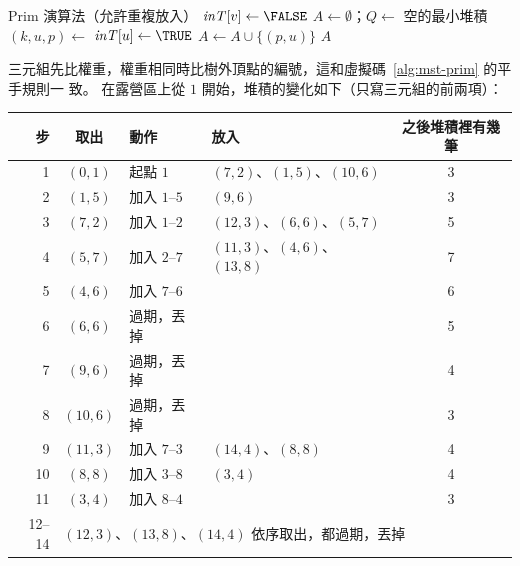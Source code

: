 \begin{pseudo}[label=alg:mst-prim-lazy]{Prim 演算法（允許重複放入）}
        \State $\mathit{inT}[v] \gets \FALSE$
    \EndFor
    \State $A \gets \emptyset$；$Q \gets$ 空的最小堆積
    \State {} 
        \State $(k, u, p) \gets$ 
         
            \State $\mathit{inT}[u] \gets \TRUE$
                \State $A \gets A \cup \{(p, u)\}$
            \EndIf
                    \State {}
                \EndIf
            \EndFor
        \EndIf
    \EndWhile
    \State \Return $A$
\EndProcedure
\end{pseudo}

三元組先比權重，權重相同時比樹外頂點的編號，這和虛擬碼~\ref{alg:mst-prim} 的平手規則一
致。 在露營區上從 $1$ 開始，堆積的變化如下（只寫三元組的前兩項）：

\begin{center}
\footnotesize
\setlength{\tabcolsep}{4pt}
\begin{tabular}{rcllc}
\toprule
步 & 取出 & 動作 & 放入 & 之後堆積裡有幾筆 \\
\midrule
1 & $(0, 1)$ & 起點 $1$ & $(7, 2)$、$(1, 5)$、$(10, 6)$ & 3 \\
2 & $(1, 5)$ & 加入 $1$--$5$ & $(9, 6)$ & 3 \\
3 & $(7, 2)$ & 加入 $1$--$2$ & $(12, 3)$、$(6, 6)$、$(5, 7)$ & 5 \\
4 & $(5, 7)$ & 加入 $2$--$7$ & $(11, 3)$、$(4, 6)$、$(13, 8)$ & 7 \\
5 & $(4, 6)$ & 加入 $7$--$6$ &  & 6 \\
6 & $(6, 6)$ & 過期，丟掉 & & 5 \\
7 & $(9, 6)$ & 過期，丟掉 & & 4 \\
8 & $(10, 6)$ & 過期，丟掉 & & 3 \\
9 & $(11, 3)$ & 加入 $7$--$3$ & $(14, 4)$、$(8, 8)$ & 4 \\
10 & $(8, 8)$ & 加入 $3$--$8$ & $(3, 4)$ & 4 \\
11 & $(3, 4)$ & 加入 $8$--$4$ &  & 3 \\
12--14 & \multicolumn{4}{l}{$(12, 3)$、$(13, 8)$、$(14, 4)$ 依序取出，都過期，丟掉} \\
\bottomrule
\end{tabular}
\end{center}

